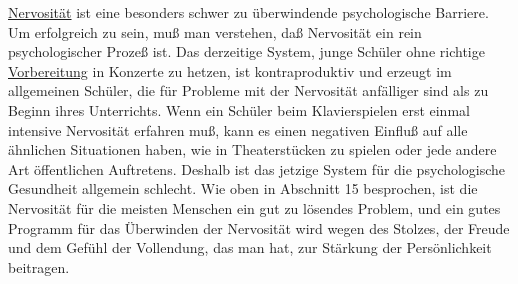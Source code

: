 \hyperlink{c1iii15}{Nervosität} ist eine besonders schwer zu überwindende psychologische Barriere.
Um erfolgreich zu sein, muß man verstehen, daß Nervosität ein rein psychologischer Prozeß ist.
Das derzeitige System, junge Schüler ohne richtige \hyperlink{c1iii14}{Vorbereitung} in Konzerte zu hetzen, ist kontraproduktiv und erzeugt im allgemeinen Schüler, die für Probleme mit der Nervosität anfälliger sind als zu Beginn ihres Unterrichts.
Wenn ein Schüler beim Klavierspielen erst einmal intensive Nervosität erfahren muß, kann es einen negativen Einfluß auf alle ähnlichen Situationen haben, wie in Theaterstücken zu spielen oder jede andere Art öffentlichen Auftretens.
Deshalb ist das jetzige System für die psychologische Gesundheit allgemein schlecht.
Wie oben in Abschnitt 15 besprochen, ist die Nervosität für die meisten Menschen ein gut zu lösendes Problem, und ein gutes Programm für das Überwinden der Nervosität wird wegen des Stolzes, der Freude und dem Gefühl der Vollendung, das man hat, zur Stärkung der Persönlichkeit beitragen.

